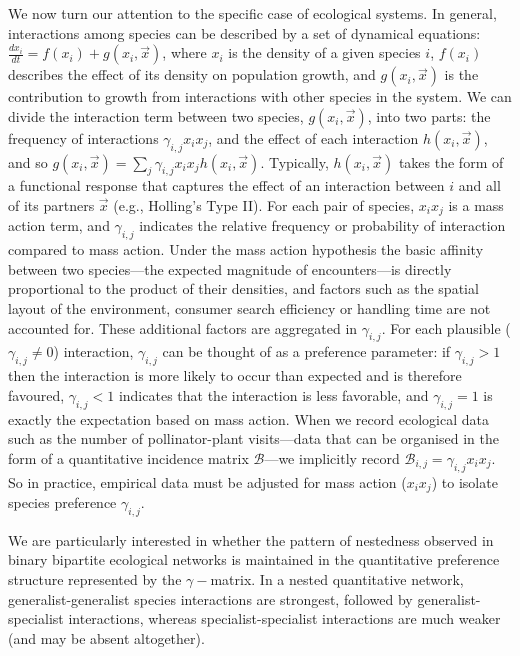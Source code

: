 \documentclass[pdftex]{nature}
\begin{document}
We now turn our attention to the specific case of ecological systems.
In general, interactions among species can be described by a set of
dynamical equations: $\frac{dx_i}{dt}=f(x_i) + g(x_i,\vec{x})$, where
$x_i$ is the density of a given species $i$, $f(x_i)$ describes the
effect of its density on population growth, and $g(x_i,\vec{x})$ is
the contribution to growth from interactions with other species in the
system\cite{rosenzweigmacarthur1963,hollanddeangelis2009,hollanddeangelis2010}.
We can divide the interaction term between two species,
$g(x_i,\vec{x})$, into two parts: the frequency of interactions
$\gamma_{i,j} x_i x_j$, and the effect of each interaction
$h(x_i,\vec{x})$, and so $g(x_i,\vec{x})=\sum_j \gamma_{i,j} x_i x_j
h(x_i,\vec{x})$.  Typically, $h(x_i,\vec{x})$ takes the form of a
functional response that captures the effect of an interaction between
$i$ and all of its partners $\vec{x}$ (e.g., Holling's Type
II\cite{HollingType21959}).  For each pair of species, $x_i x_j$ is a
mass action term, and $\gamma_{i,j}$ indicates the relative frequency
or probability of interaction compared to mass action.  Under the mass
action hypothesis the basic affinity between two species---the
expected magnitude of encounters---is directly proportional to the
product of their densities, and factors such as the spatial layout of
the environment, consumer search efficiency or handling time are not
accounted for. These additional factors are aggregated in
$\gamma_{i,j}$.  For each plausible ($\gamma_{i,j} \neq 0$)
interaction, $\gamma_{i,j}$ can be thought of as a preference
parameter: if $\gamma_{i,j}>1$ then the interaction is more likely to
occur than expected and is therefore favoured, $\gamma_{i,j}<1$
indicates that the interaction is less favorable, and $\gamma_{i,j}=1$
is exactly the expectation based on mass action.  When we record
ecological data such as the number of pollinator-plant visits---data
that can be organised in the form of a quantitative incidence matrix
$\mathcal B$---we implicitly record $\mathcal B_{i,j} = \gamma_{i,j}
x_i x_j$.  So in practice, empirical data must be adjusted for mass
action ($x_i x_j$) to isolate species preference $\gamma_{i,j}$.

We are particularly interested in whether the pattern of nestedness
observed in binary bipartite ecological
networks\cite{BascompteNestedness} is maintained in the quantitative
preference structure represented by the $\gamma-$matrix.  In a nested
quantitative network, generalist-generalist species interactions are
strongest, followed by generalist-specialist interactions, whereas
specialist-specialist interactions are much weaker (and may be absent
altogether).
\end{document}
